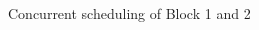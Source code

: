 \documentclass[notes xcolor=dvipsnames]{beamer}
\begin{document}
    \begin{frame}{Concurrent scheduling of Block 1 and 2}

        \begin{columns}
            
            \begin{column}{0.5\textwidth}
                \begin{figure}
                \end{figure}

                \begin{figure}
                \end{figure}

                \begin{figure}
                \end{figure}
                
            \end{column}

            \begin{column}{0.5\textwidth}
                
                \begin{figure}
                \end{figure}

                
                \begin{figure}
                \end{figure}


\end{column}
\end{columns}
\end{frame}
\end{document}
